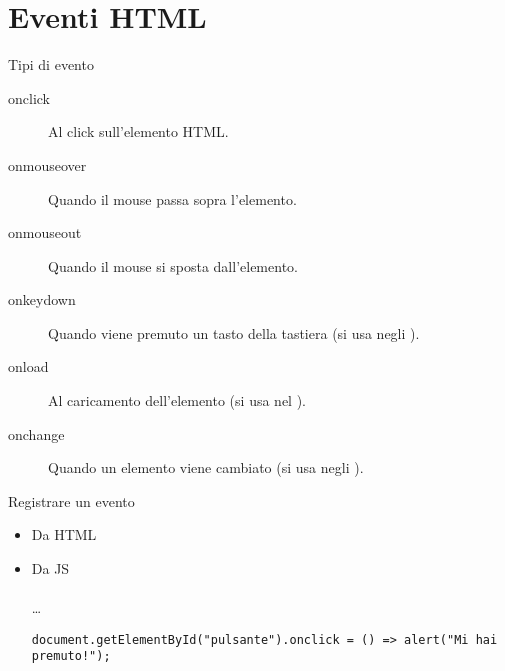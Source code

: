 \section[Eventi]{Eventi HTML}
\begin{frame}{Tipi di evento}\transfade\centering
  \begin{description}
    \item[onclick] Al click sull'elemento HTML.
    \item[onmouseover] Quando il mouse passa sopra l'elemento.
    \item[onmouseout] Quando il mouse si sposta dall'elemento.
    \item[onkeydown] Quando viene premuto un tasto della tastiera (si usa negli ).
    \item[onload] Al caricamento dell'elemento (si usa nel ).
    \item[onchange] Quando un elemento viene cambiato (si usa negli ).
  \end{description}
\end{frame}

\begin{frame}[fragile]{Registrare un evento}\transfade\centering
  \begin{itemize}[<+->]
    \item Da HTML\\
    \item Da JS\\
      \\\dots\\
      \begin{verbatim}
document.getElementById("pulsante").onclick = () => alert("Mi hai premuto!");
      \end{verbatim}
  \end{itemize}
\end{frame}
